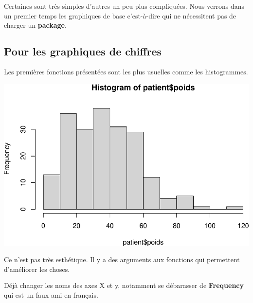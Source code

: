 \documentclass[
]{book}
\newenvironment{Shaded}{\begin{snugshade}}{\end{snugshade}}
\newcommand{\AttributeTok}[1]{\textcolor[rgb]{0.13,0.29,0.53}{#1}}
\newcommand{\FunctionTok}[1]{\textcolor[rgb]{0.13,0.29,0.53}{\textbf{#1}}}
\newcommand{\NormalTok}[1]{#1}
\newcommand{\SpecialCharTok}[1]{\textcolor[rgb]{0.81,0.36,0.00}{\textbf{#1}}}
\newcommand{\StringTok}[1]{\textcolor[rgb]{0.31,0.60,0.02}{#1}}
\begin{document}
Certaines sont très simples d'autres un peu plus compliquées. Nous verrons dans
un premier temps les graphiques de base c'est-à-dire qui ne nécessitent pas de
charger un \textbf{package}.

\subsection{Pour les graphiques de chiffres}\label{pour-les-graphiques-de-chiffres}

Les premières fonctions présentées sont les plus usuelles comme les histogrammes.

\begin{Shaded}
\end{Shaded}

\includegraphics{_main_files/figure-latex/poids1-1.pdf}

Ce n'est pas très esthétique. Il y a des arguments aux fonctions qui permettent
d'améliorer les choses.

Déjà changer les noms des axes X et y, notamment se débarasser de \textbf{Frequency}
qui est un faux ami en français.

\begin{Shaded}
\end{Shaded}
\end{document}
